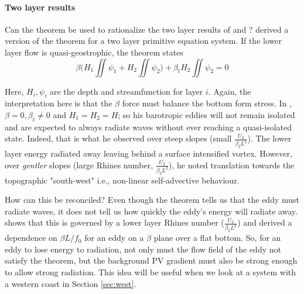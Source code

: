 \paragraph*{Two layer results}
\label{sec-5-1-2-3}
Can the theorem be used to rationalize the two layer results of \citet{LaCasce1998} and \citet{Jacob2002}? \cite{Flierl1994} derived a version of the \citet{Flierl1983} theorem for a two layer primitive equation system. If the lower layer flow is quasi-geostrophic, the theorem states
\begin{equation}
\label{eq:fsw2layer}
β \bigg ( H_1 \iint ψ_1 + H_2 \iint ψ_2 \bigg) + β_t H_2 \iint ψ_2 = 0
\end{equation}

Here, $H_i, ψ_i$ are the depth and streamfunction for layer $i$. Again, the interpretation here is that the $β$ force must balance the bottom form stress. In \citet{LaCasce1998}, $β = 0, β_t ≠ 0$ and $H_1 = H_2 = H$; so his barotropic eddies will not remain isolated and are expected to always radiate waves without ever reaching a quasi-isolated state. Indeed, that is what he observed over steep slopes (small $\frac{U_2}{β_2L^2}$). The lower layer energy radiated away leaving behind a surface intensified vortex. However, over \emph{gentler} slopes (large Rhines number, $\frac{U_2}{β_2L^2}$), he noted translation towards the topographic "south-west" i.e., non-linear self-advective behaviour.

How can this be reconciled? Even though the theorem tells us that the eddy must radiate waves, it does not tell us how quickly the eddy's energy will radiate away. \citet{LaCasce1998} shows that this is governed by a lower layer Rhines number ($\frac{U_2}{β_2L^2}$) and \citet{Flierl1984} derived a dependence on $βL/f_0$ for an eddy on a $β$ plane over a flat bottom. So, for an eddy to lose energy to radiation, not only must the flow field of the eddy not satisfy the theorem, but the background PV gradient must also be strong enough to allow strong radiation. This idea will be useful when we look at a system with a western coast in Section \ref{sec:west}.

